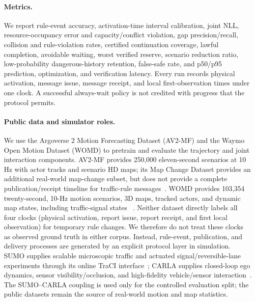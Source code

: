 \documentclass[letterpaper]{article} %
\begin{document}
\paragraph{Metrics.}
We report rule-event accuracy, activation-time interval calibration, joint NLL, resource-occupancy error and capacity/conflict violation, gap precision/recall, collision and rule-violation rates, certified continuation coverage, lawful completion, avoidable waiting, worst verified reserve, scenario reduction ratio, low-probability dangerous-history retention, false-safe rate, and p50/p95 prediction, optimization, and verification latency. Every run records physical activation, message issue, message receipt, and local first-observation times under one clock. A successful always-wait policy is not credited with progress that the protocol permits.

\paragraph{Public data and simulator roles.}
We use the Argoverse 2 Motion Forecasting Dataset (AV2-MF) and the Waymo
Open Motion Dataset (WOMD) to pretrain and evaluate the trajectory and joint
interaction components. AV2-MF provides 250,000 eleven-second scenarios at
10 Hz with actor tracks and scenario HD maps; its Map Change Dataset provides
an additional real-world map-change subset, but does not provide a complete
publication/receipt timeline for traffic-rule messages~\citep{wilson2023argoverse}.
WOMD provides 103,354 twenty-second, 10-Hz motion scenarios, 3D maps,
tracked actors, and dynamic map states, including traffic-signal states
~\citep{ettinger2021large}. Neither dataset directly labels all four clocks
(physical activation, report issue, report receipt, and first local observation)
for temporary rule changes. We therefore do not treat these clocks as
observed ground truth in either corpus. Instead, rule-event, publication, and
delivery processes are generated by an explicit protocol layer in simulation.
SUMO supplies scalable microscopic traffic and actuated signal/reversible-lane
experiments through its online TraCI interface~\citep{sumo2018}; CARLA supplies
closed-loop ego dynamics, sensor visibility/occlusion, and high-fidelity
vehicle/sensor interaction~\citep{dosovitskiy2017carla}. The SUMO--CARLA
coupling is used only for the controlled evaluation split; the public datasets
remain the source of real-world motion and map statistics.
\end{document}
